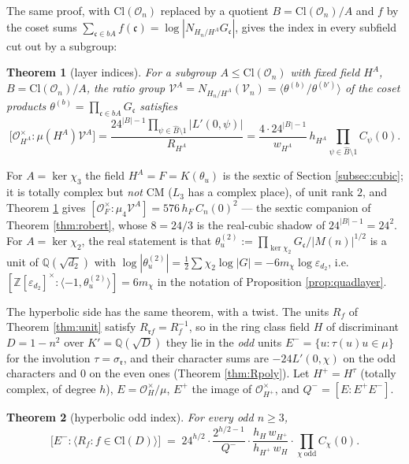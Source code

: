 \documentclass[11pt]{amsart}
\numberwithin{equation}{section}
\theoremstyle{plain}
\newtheorem{theorem}{Theorem}[section]
\theoremstyle{definition}
\theoremstyle{remark}
\newcommand{\Q}{\mathbb{Q}}
\newcommand{\Z}{\mathbb{Z}}
\newcommand{\Cl}{\mathrm{Cl}}
\newcommand{\idealc}{\mathfrak{c}}
\newcommand{\idealr}{\mathfrak{r}}
\newcommand{\Oc}{\mathcal{O}}
\newcommand{\eps}{\varepsilon}
\begin{document}
The same proof, with $\Cl(\Oc_n)$ replaced by a quotient $B = \Cl(\Oc_n)/A$
and $f$ by the coset sums $\sum_{\idealc\in bA}f(\idealc) =
\log|N_{H_n/H^A}G_\idealc|$, gives the index in every subfield cut out by a
subgroup:

\begin{theorem}[layer indices]\label{thm:layers}
For a subgroup $A \le \Cl(\Oc_n)$ with fixed field $H^A$, $B = \Cl(\Oc_n)/A$,
the ratio group $\mathcal{V}^A = N_{H_n/H^A}(\mathcal{V}_n) = \langle\theta^{(b)}/\theta^{(b')}\rangle$
of the coset products $\theta^{(b)} = \prod_{\idealc\in bA}G_\idealc$
satisfies
\[
  \bigl[\Oc_{H^A}^\times:\mu(H^A)\mathcal{V}^A\bigr]
  = \frac{24^{|B|-1}\prod_{\psi\in\widehat B\setminus1}|L'(0,\psi)|}{R_{H^A}}
  = \frac{4\cdot24^{|B|-1}}{w_{H^A}}\,h_{H^A}\prod_{\psi\in\widehat B\setminus1}C_\psi(0).
\]
\end{theorem}

For $A = \ker\chi_3$ the field $H^A = F = K(\theta_u)$ is the sextic of
Section \ref{subsec:cubic}; it is totally complex but \emph{not} CM ($L_3$
has a complex place), of unit rank $2$, and Theorem \ref{thm:layers}
gives $[\Oc_F^\times:\mu_4\mathcal{V}^A] = 576\,h_F\,C_n(0)^2$ — the sextic
companion of Theorem \ref{thm:robert}, whose $8 = 24/3$ is the real-cubic
shadow of $24^{|B|-1} = 24^2$.  For $A = \ker\chi_2$, the real statement is
that $\theta^{(2)}_u := \prod_{\ker\chi_2}G_\idealc/|M(n)|^{1/2}$ is a unit of
$\Q(\sqrt{d_2})$ with $\log|\theta^{(2)}_u| = \tfrac12\sum\chi_2\log|G| =
-6m_\chi\log\eps_{d_2}$, i.e.\ $[\Z[\eps_{d_2}]^\times:\langle-1,\theta_u^{(2)}\rangle] = 6m_\chi$
in the notation of Proposition \ref{prop:quadlayer}.

The hyperbolic side has the same theorem, with a twist.  The units $R_f$
of Theorem \ref{thm:unit} satisfy $R_{\idealr f} = R_f^{-1}$, so in the ring
class field $H$ of discriminant $D = 1 - n^2$ over $K' = \Q(\sqrt D)$ they lie
in the \emph{odd} units $E^- = \{u : \tau(u)u \in \mu\}$ for the involution
$\tau = \sigma_\idealr$, and their character sums are $-24L'(0,\chi)$ on the odd
characters and $0$ on the even ones (Theorem \ref{thm:Rpoly}).  Let
$H^+ = H^\tau$ (totally complex, of degree $h$), $E = \Oc_H^\times/\mu$,
$E^+$ the image of $\Oc_{H^+}^\times$, and $Q^- = [E:E^+E^-]$.

\begin{theorem}[hyperbolic odd index]\label{thm:hypindex}
For every odd $n \ge 3$,
\[
  \bigl[E^- : \langle R_f : f \in \Cl(D)\rangle\bigr]
  \;=\; 24^{h/2}\cdot\frac{2^{h/2-1}}{Q^-}\cdot\frac{h_H\,w_{H^+}}{h_{H^+}\,w_H}
  \cdot\prod_{\chi\ \mathrm{odd}}C_\chi(0).
\]
\end{theorem}
\end{document}
